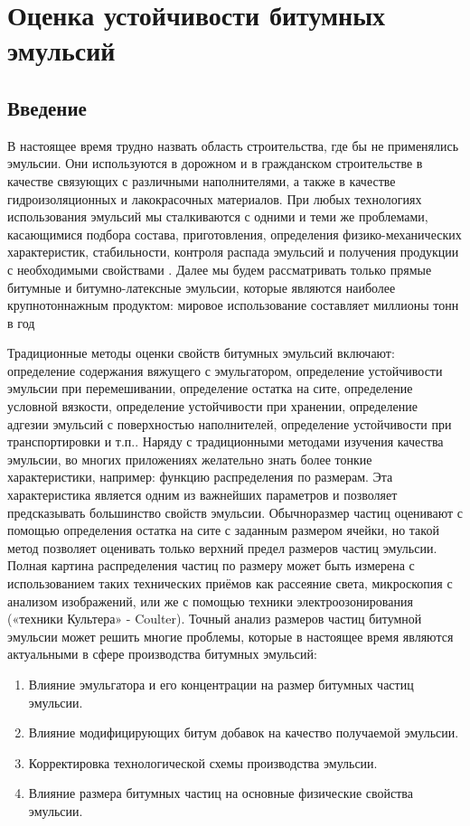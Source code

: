 \section{Оценка устойчивости битумных эмульсий}
\subsection{Введение}
В настоящее время трудно назвать область строительства, где бы не применялись эмульсии. Они используются в дорожном и в гражданском строительстве в качестве связующих с различными наполнителями, а также в качестве гидроизоляционных и лакокрасочных материалов. При любых технологиях использования эмульсий мы сталкиваются с одними и теми же проблемами, касающимися подбора состава, приготовления, определения физико-механических характеристик, стабильности, контроля распада эмульсий и получения продукции с необходимыми свойствами \cite{road_emulsions}. Далее мы будем рассматривать только прямые битумные и битумно-латексные эмульсии, которые являются наиболее крупнотоннажным продуктом: мировое использование составляет миллионы тонн в год

Традиционные методы оценки свойств битумных эмульсий включают: определение содержания вяжущего с эмульгатором, определение устойчивости эмульсии при перемешивании, определение остатка на сите, определение условной вязкости, определение устойчивости при хранении, определение адгезии эмульсий с поверхностью наполнителей, определение устойчивости при транспортировки и т.п..  Наряду с традиционными методами изучения  качества эмульсии, во многих приложениях желательно знать более тонкие характеристики, например: функцию распределения по размерам. Эта характеристика является одним из важнейших параметров и позволяет предсказывать большинство свойств эмульсии. Обычноразмер частиц оценивают с помощью определения остатка на сите с заданным размером ячейки, но такой метод позволяет оценивать только верхний предел размеров частиц эмульсии. Полная картина распределения частиц по размеру может быть измерена с использованием таких технических приёмов как рассеяние света, микроскопия с анализом изображений, или же с помощью техники электроозонирования («техники Культера» - Coulter). Точный анализ размеров частиц битумной эмульсии может решить многие проблемы, которые в настоящее время являются актуальными в сфере производства битумных эмульсий:
\begin{enumerate}
\item Влияние эмульгатора и его концентрации на размер битумных частиц эмульсии.
\item Влияние модифицирующих битум добавок на качество получаемой эмульсии.
\item Корректировка технологической схемы производства эмульсии.
\item Влияние размера битумных частиц на основные физические свойства эмульсии.
\end{enumerate}

